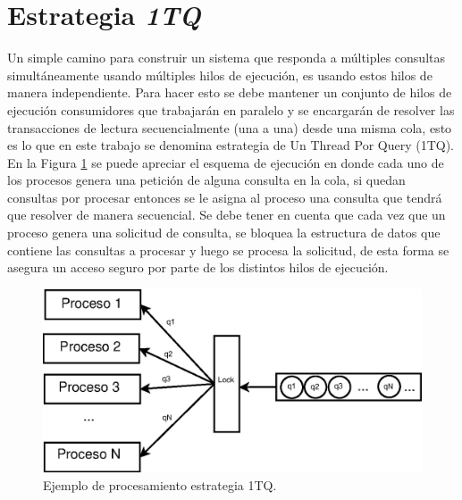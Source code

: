 \section{Estrategia \textit{1TQ}}
\label{scheduling:baseline}
Un simple camino para construir un sistema que responda a múltiples consultas simultáneamente usando múltiples hilos de ejecución, es usando estos hilos de manera independiente. Para hacer esto se debe mantener un conjunto de hilos de ejecución consumidores que trabajarán en paralelo y se encargarán de resolver las transacciones de lectura secuencialmente (una a una) desde una misma cola, esto es lo que en este trabajo se denomina estrategia de Un Thread Por Query (1TQ). En la Figura \ref{fig:1TQ} se puede apreciar el esquema de ejecución en donde cada uno de los procesos genera una petición de alguna consulta en la cola, si quedan consultas por procesar entonces se le asigna al proceso una consulta que tendrá que resolver de manera secuencial. Se debe tener en cuenta que cada vez que un proceso genera una solicitud de consulta, se bloquea la estructura de datos que contiene las consultas a procesar y luego se procesa la solicitud, de esta forma se asegura un acceso seguro por parte de los distintos hilos de ejecución. 

\begin{figure}[H]
\centering
\includegraphics[scale=.75]{images/1TQ.eps}
\caption{Ejemplo de procesamiento estrategia 1TQ.}
\label{fig:1TQ}
\end{figure}

